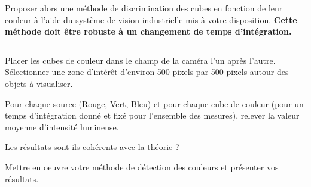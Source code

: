 \Quest Proposer alors une méthode de discrimination des cubes en fonction de leur couleur à l'aide du système de vision industrielle mis à votre disposition. \textbf{Cette méthode doit être robuste à un changement de temps d'intégration.}


\noindent \rule{\linewidth}{1pt}

\Manip Placer les cubes de couleur dans le champ de la caméra l'un après l'autre. Sélectionner une zone d'intérêt d'environ 500 pixels par 500 pixels autour des objets à visualiser. 

\Manip Pour chaque source (Rouge, Vert, Bleu) et pour chaque cube de couleur (pour un temps d'intégration donné et fixé pour l'ensemble des mesures), relever la valeur moyenne d'intensité lumineuse. 

\Quest Les résultats sont-ils cohérents avec la théorie ?

\Manip Mettre en oeuvre votre méthode de détection des couleurs et présenter vos résultats.


